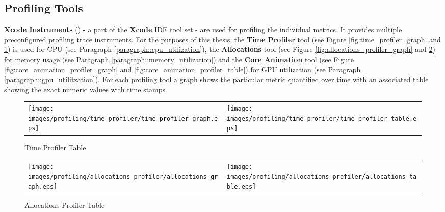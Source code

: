\subsection{Profiling Tools} \label{subsection::profiling_tooling}
\textbf{Xcode Instruments} (\cite{Apple2019}) - a part of the \textbf{Xcode} IDE tool set - are used for profiling the individual metrics. It provides multiple preconfigured
profiling trace instruments.
For the purposes of this thesis, the \textbf{Time Profiler} tool (see Figure \ref{fig:time_profiler_graph} and \ref{fig:time_profiler_table}) is used for CPU (see Paragraph \ref{paragraph::cpu_utilization}),
the \textbf{Allocations} tool (see Figure \ref{fig:allocations_profiler_graph} and \ref{fig:allocations_profiler_table}) for memory usage (see Paragraph \ref{paragraph::memory_utilization}) and the \textbf{Core Animation} tool (see Figure \ref{fig:core_animation_profiler_graph} and \ref{fig:core_animation_profiler_table}) for GPU utilization (see Paragraph \ref{paragraph::gpu_utilitzation}).
For each profiling tool a graph shows the particular metric quantified over time with an associated table showing the exact numeric values with time stamps.

\begin{figure}[htbp]
    \begin{tabular}{p{}p{}}
        \begin{minipage}{.5\textwidth}
        \centering
        \texttt{[image: images/profiling/time\_profiler/time\_profiler\_graph.eps]}
        \caption{Time Profiler Graph}
        \label{fig:time_profiler_graph}
        \end{minipage}
        &
        \begin{minipage}{.5\textwidth}
            \centering
            \texttt{[image: images/profiling/time\_profiler/time\_profiler\_table.eps]}
            \caption{Time Profiler Table}
            \label{fig:time_profiler_table}
        \end{minipage}
    \end{tabular}
\end{figure}

\begin{figure}[htbp]
    \begin{tabular}{p{}p{}}
        \begin{minipage}{.5\textwidth}
        \centering
        \texttt{[image: images/profiling/allocations\_profiler/allocations\_graph.eps]}
        \caption{Allocations Profiler Graph}
        \label{fig:allocations_profiler_graph}
        \end{minipage}
        &
        \begin{minipage}{.5\textwidth}
            \centering
            \texttt{[image: images/profiling/allocations\_profiler/allocations\_table.eps]}
            \caption{Allocations Profiler Table}
            \label{fig:allocations_profiler_table}
        \end{minipage}
    \end{tabular}
\end{figure}

